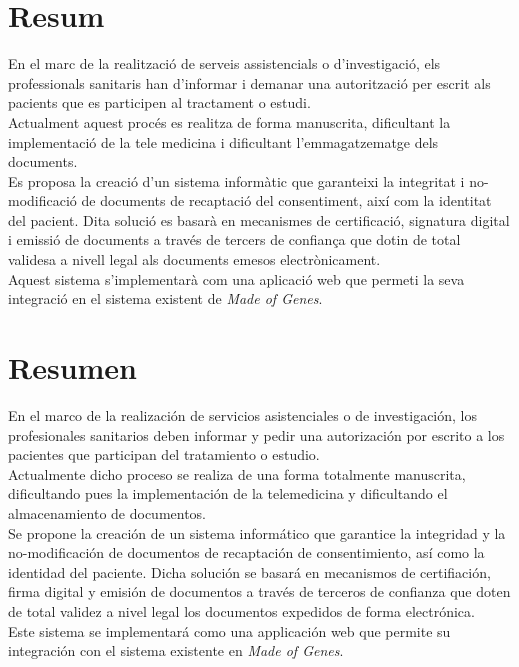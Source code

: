 \chapter*{Resum}

En el marc de la realització de serveis assistencials o d'investigació, els professionals sanitaris han d'informar i demanar una autorització per escrit als pacients que es participen al tractament o estudi.\\ \newline Actualment aquest procés es realitza de forma manuscrita, dificultant la implementació de la tele medicina i dificultant l’emmagatzematge dels documents.\\
\newline Es proposa la creació d'un sistema informàtic que garanteixi la integritat i no-modificació de documents de recaptació del consentiment, així com la identitat del pacient. Dita solució es basarà en mecanismes de certificació, signatura digital i emissió de documents a través de tercers de confiança que dotin de total validesa a nivell legal als documents emesos electrònicament.\\
\newline Aquest sistema s’implementarà com una aplicació web que permeti la seva integració en el sistema existent de \textit{Made of Genes}.
\clearpage
\chapter*{Resumen}
En el marco de la realización de servicios asistenciales o de investigación, los profesionales sanitarios deben informar y pedir una autorización por escrito a los pacientes que participan del tratamiento o estudio.\\
\newline Actualmente dicho proceso se realiza de una forma totalmente manuscrita, dificultando pues la implementación de la telemedicina y dificultando el almacenamiento de documentos.\\
\newline Se propone la creación de un sistema informático que garantice la integridad y la no-modificación de documentos de recaptación de consentimiento, así como la identidad del paciente. Dicha solución se basará en mecanismos de certifiación, firma digital y emisión de documentos a través de terceros de confianza que doten de total validez a nivel legal los documentos expedidos de forma electrónica.\\
\newline Este sistema se implementará como una applicación web que permite su integración con el sistema existente en \textit{Made of Genes}.
\clearpage
